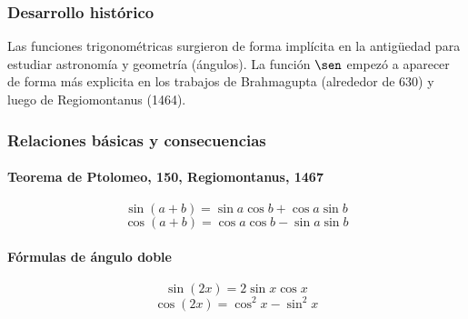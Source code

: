 \documentclass[12pt, a4paper]{article}
\theoremstyle{rioplatense}
\begin{document}
\subsubsection{Desarrollo histórico}
Las funciones trigonométricas surgieron de forma implícita en la antigüedad para estudiar astronomía y geometría (ángulos). %
La función $\sen$ empezó a aparecer de forma más explicita en los trabajos de %
Brahmagupta (alrededor de 630) y luego %
de Regiomontanus (1464). %



\subsubsection{Relaciones básicas y consecuencias}

\paragraph{Teorema de Ptolomeo, 150, Regiomontanus, 1467}
\[
\sin(a + b) = \sin a \cos b + \cos a \sin b
\]
\[
\cos(a + b) = \cos a \cos b - \sin a \sin b
\]

\paragraph{Fórmulas de ángulo doble}
\[
\sin(2x) = 2 \sin x \cos x
\]
\[
\cos(2x) = \cos^2 x - \sin^2 x
\]
\end{document}
